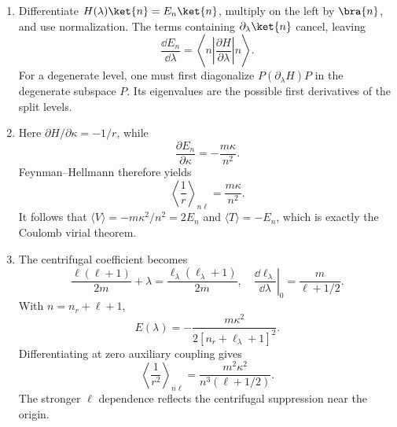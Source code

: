 \begin{enumerate}
\begin{enumerate}
\item
Differentiate
\(H(\lambda)\ket{n}=E_n\ket{n}\), multiply on the left by
\(\bra{n}\), and use normalization.  The terms containing
\(\partial_\lambda\ket{n}\) cancel, leaving
\[
 \boxed{\frac{\dd E_n}{\dd\lambda}
 =\left\langle n\left|\frac{\partial H}{\partial\lambda}\right|n\right\rangle.}
\]
For a degenerate level, one must first diagonalize
\(P(\partial_\lambda H)P\) in the degenerate subspace \(P\).  Its
eigenvalues are the possible first derivatives of the split levels.
\item
Here
\(\partial H/\partial\kappa=-1/r\), while
\[
 \frac{\partial E_n}{\partial\kappa}
 =-\frac{m\kappa}{n^2}.
\]
Feynman--Hellmann therefore yields
\[
 \boxed{\left\langle\frac1r\right\rangle_{n\ell}
 =\frac{m\kappa}{n^2}.}
\]
It follows that
\(\langle V\rangle=-m\kappa^2/n^2=2E_n\) and
\(\langle T\rangle=-E_n\), which is exactly the Coulomb virial theorem.
\item
The centrifugal coefficient becomes
\[
 \frac{\ell(\ell+1)}{2m}+\lambda
 =\frac{\ell_\lambda(\ell_\lambda+1)}{2m},
\quad
 \left.\frac{\dd\ell_\lambda}{\dd\lambda}\right|_0
 =\frac{m}{\ell+1/2}.
\]
With \(n=n_r+\ell+1\),
\[
 E(\lambda)=-\frac{m\kappa^2}
 {2[n_r+\ell_\lambda+1]^2}.
\]
Differentiating at zero auxiliary coupling gives
\[
 \boxed{\left\langle\frac1{r^2}\right\rangle_{n\ell}
 =\frac{m^2\kappa^2}{n^3(\ell+1/2)}.}
\]
The stronger \(\ell\) dependence reflects the centrifugal suppression near
the origin.
\end{enumerate}


\end{enumerate}
